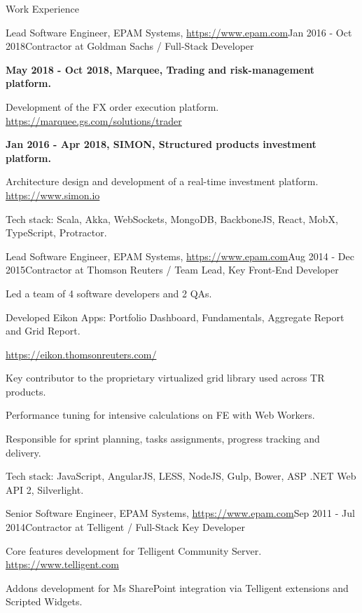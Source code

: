 \documentclass{resume}
\begin{document}
\begin{rSection}{Work Experience}
\begin{rSubsection}{Lead Software Engineer, EPAM Systems, \url{https://www.epam.com}}{Jan 2016 - Oct 2018}{Contractor at Goldman Sachs / Full-Stack Developer}{}
\item[] \textbf{May 2018 - Oct 2018, Marquee, Trading and risk-management platform.}
\item Development of the FX order execution platform. \url{https://marquee.gs.com/solutions/trader}

\item[] \textbf{Jan 2016 - Apr 2018, SIMON, Structured products investment platform.}
\item Architecture design and development of a real-time investment platform. \url{https://www.simon.io}

Tech stack: Scala, Akka, WebSockets, MongoDB, BackboneJS, React, MobX, TypeScript, Protractor.
\end{rSubsection}


\begin{rSubsection}{Lead Software Engineer, EPAM Systems, \url{https://www.epam.com}}{Aug 2014 - Dec 2015}{Contractor at Thomson Reuters / Team Lead, Key Front-End Developer}{}
\item Led a team of 4 software developers and 2 QAs.
\item Developed Eikon Apps: Portfolio Dashboard, Fundamentals, Aggregate Report and Grid Report.
\item[] \url{https://eikon.thomsonreuters.com/}
\item Key contributor to the proprietary virtualized grid library used across TR products.
\item Performance tuning for intensive calculations on FE with Web Workers.
\item Responsible for sprint planning, tasks assignments, progress tracking and delivery.

Tech stack: JavaScript, AngularJS, LESS, NodeJS, Gulp, Bower, ASP .NET Web API 2, Silverlight.
\end{rSubsection}

\begin{rSubsection}{Senior Software Engineer, EPAM Systems, \url{https://www.epam.com}}{Sep 2011 - Jul 2014}{Contractor at Telligent / Full-Stack Key Developer}{}
\item Core features development for Telligent Community Server. \url{https://www.telligent.com}
\item Addons development for Ms SharePoint integration via Telligent extensions and Scripted Widgets.


\end{rSubsection}
\end{rSection}
\end{document}
